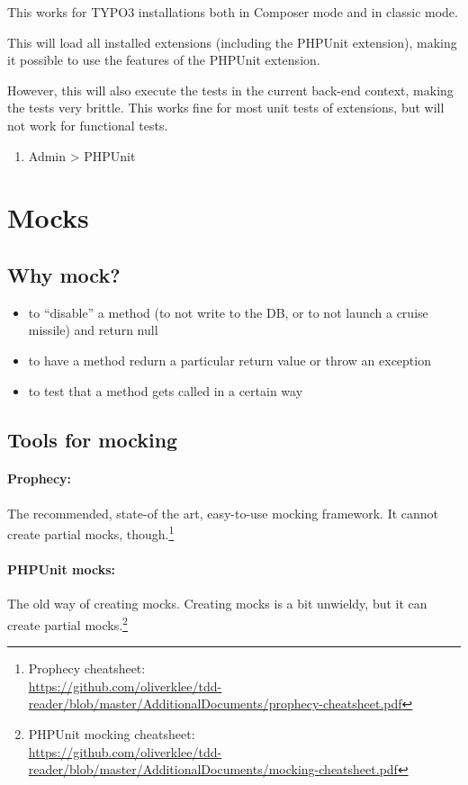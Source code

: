 \documentclass[a4paper,10pt,headsepline]{scrartcl}
\begin{document}
This works for TYPO3 installations both in Composer mode and in classic mode.

This will load all installed extensions (including the PHPUnit extension), making it possible to use the features of the PHPUnit extension.

However, this will also execute the tests in the current back-end context, making the tests very brittle. This works fine for most unit tests of extensions, but will not work for functional tests.

\begin{enumerate}
  \item Admin > PHPUnit
\end{enumerate}



\pagebreak
\section{Mocks}

\subsection{Why mock?}
\begin{itemize}
  \item to ``disable'' a method (to not write to the DB, or to not launch a cruise missile) and return null
  \item to have a method redurn a particular return value or throw an exception
  \item to test that a method gets called in a certain way
\end{itemize}

\subsection{Tools for mocking}

\paragraph{Prophecy:} The recommended, state-of the art, easy-to-use mocking framework. It cannot create partial mocks, though.\footnote{Prophecy cheatsheet:\\ \url{https://github.com/oliverklee/tdd-reader/blob/master/AdditionalDocuments/prophecy-cheatsheet.pdf}}
\paragraph{PHPUnit mocks:} The old way of creating mocks. Creating mocks is a bit unwieldy, but it can create partial mocks.\footnote{PHPUnit mocking cheatsheet:\\ \url{https://github.com/oliverklee/tdd-reader/blob/master/AdditionalDocuments/mocking-cheatsheet.pdf}}
\end{document}
